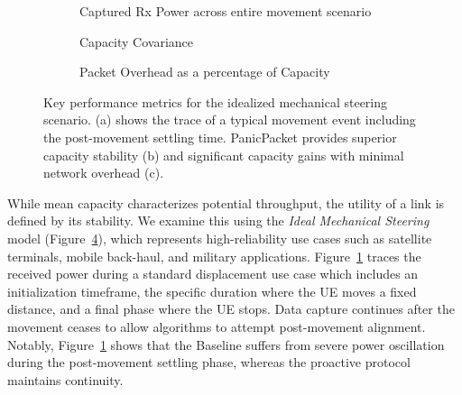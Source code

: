\documentclass[fleqn,10pt]{wlscirep}
\begin{document}
\begin{figure}[ht!]
    \centering
    \begin{subfigure}[t]{0.49\textwidth}
        \vspace{0pt} %
        \centering
        
        \vspace{-25 pt}
        \caption{Captured Rx Power across entire movement scenario}
        \label{fig:trans_metrics_example}
    \end{subfigure}%
    \hfill
    \begin{minipage}[t]{0.49\textwidth}
        \vspace{0pt} %
        \centering
        \begin{subfigure}{\linewidth}
        
        \vspace{-25 pt}
        \caption{Capacity Covariance}
        \label{fig:trans_metrics_covariance}
        
    \end{subfigure}
    \vfill
        \begin{subfigure}{\linewidth}
        
        \vspace{-25 pt}
        \caption{Packet Overhead as a percentage of Capacity}
        \label{fig:trans_metrics_overhead}
    \end{subfigure}
    \end{minipage}
    \caption{Key performance metrics for the idealized mechanical steering scenario. (a) shows the trace of a typical movement event including the post-movement settling time. PanicPacket provides superior capacity stability (b) and significant capacity gains with minimal network overhead (c).}
    \label{fig:translational_metrics}
    \vspace{-10 pt}
\end{figure}

While mean capacity characterizes potential throughput, the utility of a link is defined by its stability. We examine this using the \textit{Ideal Mechanical Steering} model (Figure~\ref{fig:translational_metrics}), which represents high-reliability use cases such as satellite terminals, mobile back-haul, and military applications. Figure~\ref{fig:trans_metrics_example} traces the received power during a standard displacement use case which includes an initialization timeframe, the specific duration where the UE moves a fixed distance, and a final phase where the UE stops. Data capture continues after the movement ceases to allow algorithms to attempt post-movement alignment. Notably, Figure~\ref{fig:trans_metrics_example} shows that the Baseline suffers from severe power oscillation during the post-movement settling phase, whereas the proactive protocol maintains continuity.
\end{document}
